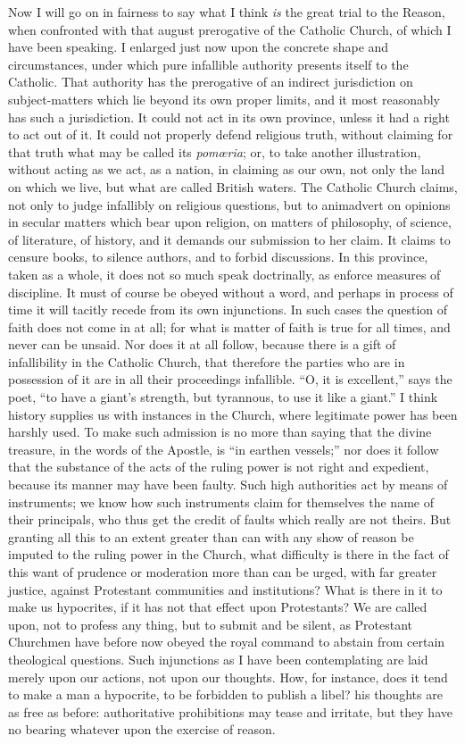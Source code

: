 Now I will go on in fairness to say what I think \emph{is} the great trial
to the Reason, when confronted with that august prerogative of the
Catholic Church, of which I have been speaking. I enlarged just now upon
the concrete shape and circumstances, under which pure infallible
authority presents itself to the Catholic. That authority has the
prerogative of an indirect jurisdiction on subject-matters which lie
beyond its own proper limits, and it most reasonably has such a
jurisdiction. It could not act in its own province, unless it had a
right to act out of it. It could not properly defend religious truth,
without claiming for that truth what may be called its \emph{pomœria};
or, to take another illustration, without acting as we act, as a nation,
in claiming as our own, not only the land on which we live, but what are
called British waters. The Catholic Church claims, not only to judge
infallibly on religious questions, but to animadvert on opinions in
secular matters which bear upon religion, on matters of
philosophy, of science, of literature, of history, and it demands our
submission to her claim. It claims to censure books, to silence authors,
and to forbid discussions. In this province, taken as a
whole, it does not so much speak doctrinally, as enforce measures of
discipline. It must of course be obeyed without a word, and perhaps in
process of time it will tacitly recede from its own injunctions. In such
cases the question of faith does not come in at all; for what is
matter of faith is true for all times, and never can be unsaid. Nor does
it at all follow, because there is a gift of infallibility in the
Catholic Church, that therefore the parties who are in possession of it
are in all their proceedings infallible. ``O, it is excellent,''
says the poet, ``to have a giant's strength, but tyrannous, to use
it like a giant.'' I think history supplies us with instances in the
Church, where legitimate power has been harshly used. To make such
admission is no more than saying that the divine treasure, in the words
of the Apostle, is ``in earthen vessels;'' nor does it follow
that the substance of the acts of the ruling power is not right and
expedient, because its manner may have been faulty. Such high
authorities act by means of instruments; we know how such instruments
claim for themselves the name of their principals, who thus get the
credit of faults which really are not theirs. But granting all this to
an extent greater than can with any show of reason be imputed to the
ruling power in the Church, what difficulty is there in the
fact of this want of prudence or moderation more than can be urged,
with far greater justice, against Protestant communities and
institutions? What is there in it to make us hypocrites, if it has not
that effect upon Protestants? We are called upon, not to profess any
thing, but to submit and be silent, as Protestant Churchmen have
before now obeyed the royal command to abstain from certain theological
questions. Such injunctions as I have been contemplating are
laid merely upon our actions, not upon our thoughts. How, for instance,
does it tend to make a man a hypocrite, to be forbidden to publish a
libel? his thoughts are as free as before: authoritative
prohibitions may tease and irritate, but they have no bearing whatever
upon the exercise of reason.


